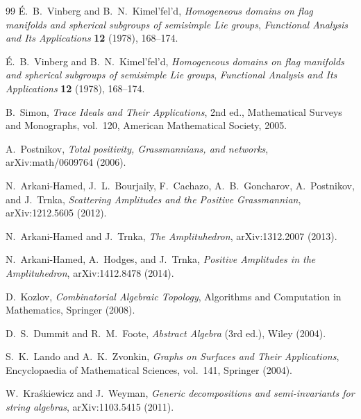 \documentclass[11pt,oneside]{amsbook}
\numberwithin{equation}{section}
\theoremstyle{plain}
\theoremstyle{definition}
\theoremstyle{remark}
\begin{document}
\begin{thebibliography}{99}
\'E.~B.~Vinberg and B.~N.~Kimel'fel'd,
\newblock \emph{Homogeneous domains on flag manifolds and spherical subgroups of semisimple Lie groups},
\newblock \emph{Functional Analysis and Its Applications} \textbf{12} (1978), 168--174.

\'E.~B.~Vinberg and B.~N.~Kimel'fel'd,
\newblock \emph{Homogeneous domains on flag manifolds and spherical subgroups of semisimple Lie groups},
\newblock \emph{Functional Analysis and Its Applications} \textbf{12} (1978), 168--174.

B.~Simon,
\newblock \emph{Trace Ideals and Their Applications}, 2nd ed.,
\newblock Mathematical Surveys and Monographs, vol.~120, American Mathematical Society, 2005.


A.~Postnikov,
\newblock \emph{Total positivity, Grassmannians, and networks},
\newblock arXiv:math/0609764 (2006).

N.~Arkani-Hamed, J.~L.~Bourjaily, F.~Cachazo, A.~B.~Goncharov, A.~Postnikov, and J.~Trnka,
\newblock \emph{Scattering Amplitudes and the Positive Grassmannian},
\newblock arXiv:1212.5605 (2012).

N.~Arkani-Hamed and J.~Trnka,
\newblock \emph{The Amplituhedron},
\newblock arXiv:1312.2007 (2013).

N.~Arkani-Hamed, A.~Hodges, and J.~Trnka,
\newblock \emph{Positive Amplitudes in the Amplituhedron},
\newblock arXiv:1412.8478 (2014).



D.~Kozlov,
\newblock \emph{Combinatorial Algebraic Topology},
\newblock Algorithms and Computation in Mathematics, Springer (2008).

D.~S.~Dummit and R.~M.~Foote,
\newblock \emph{Abstract Algebra} (3rd ed.),
\newblock Wiley (2004).

S.~K.~Lando and A.~K.~Zvonkin,
\newblock \emph{Graphs on Surfaces and Their Applications},
\newblock Encyclopaedia of Mathematical Sciences, vol.~141, Springer (2004).

W.~Kra\'skiewicz and J.~Weyman,
\newblock \emph{Generic decompositions and semi-invariants for string algebras},
\newblock arXiv:1103.5415 (2011).


\end{thebibliography}
\end{document}
